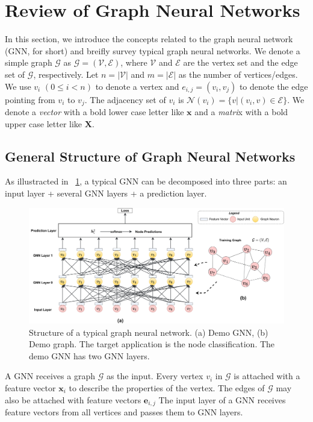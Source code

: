 \section{Review of Graph Neural Networks}

In this section, we introduce the concepts related to the graph neural network (GNN, for short) and breifly survey typical graph neural networks.
We denote a simple graph $\mathcal{G}$ as $\mathcal{G}=(\mathcal{V}, \mathcal{E})$, where $\mathcal{V}$ and $\mathcal{E}$ are the vertex set and the edge set of $\mathcal{G}$, respectively.
Let $n=|\mathcal{V}|$ and $m=|\mathcal{E}|$ as the number of vertices/edges. 
We use $v_i$ $(0 \leq i < n)$ to denote a vertex and $e_{i,j}=(v_i, v_j)$ to denote the edge pointing from $v_i$ to $v_j$.
The adjacency set of $v_i$ is $\mathcal{N}(v_i)=\{v|(v_i, v) \in \mathcal{E}\}$.
We denote a \emph{vector} with a bold lower case letter like $\boldsymbol{x}$ and a \emph{matri}x with a bold upper case letter like $\boldsymbol{X}$.

\subsection{General Structure of Graph Neural Networks}

As illustracted in \figurename~\ref{fig:general_structure_of_gnn}, a typical GNN can be decomposed into three parts: an input layer + several GNN layers + a prediction layer.

\begin{figure}
	\centering
	\includegraphics[width=1\columnwidth]{figs/illustration/GNN_common_architecture.png}
	\caption{Structure of a typical graph neural network. (a) Demo GNN, (b) Demo graph. The target application is the node classification. The demo GNN has two GNN layers.}
	\label{fig:general_structure_of_gnn}
\end{figure}

A GNN receives a graph $\mathcal{G}$ as the input.
Every vertex $v_i$ in $\mathcal{G}$ is attached with a feature vector $\boldsymbol{x}_i$ to describe the properties of the vertex.
The edges of $\mathcal{G}$ may also be attached with feature vectors $\boldsymbol{e}_{i,j}$
The input layer of a GNN receives feature vectors from all vertices and passes them to GNN layers.

